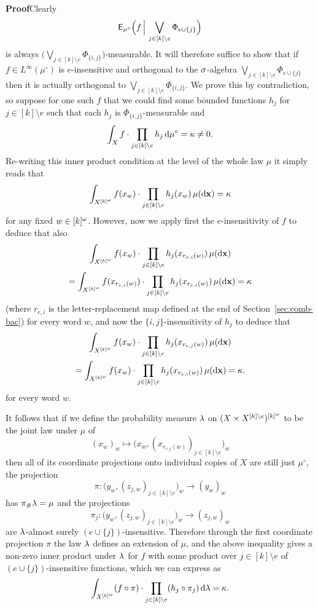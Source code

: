 \documentclass[11pt]{article}
\begin{document}
\textbf{Proof}\quad Clearly
\[\mathsf{E}_{\mu^\circ}\Big(f\,\Big|\,\bigvee_{j\in[k]\setminus e}\Phi_{e\cup\{j\}}\Big)\]
is always $\big(\bigvee_{j\in[k]\setminus
e}\Phi_{\{i,j\}}\big)$-measurable. It will therefore suffice to show
that if $f \in L^\infty(\mu^\circ)$ is $e$-insensitive and
orthogonal to the $\sigma$-algebra $\bigvee_{j\in [k]\setminus
e}\Phi_{e\cup\{j\}}$ then it is actually orthogonal to
$\bigvee_{j\in[k]\setminus e}\Phi_{\{i,j\}}$.  We prove this by
contradiction, so suppose for one such $f$ that we could find some
bounded functions $h_j$ for $j\in[k]\setminus e$ such that each
$h_j$ is $\Phi_{\{i,j\}}$-measurable and
\[\int_X f\cdot \prod_{j\in [k]\setminus e}h_j\,\mathrm{d}\mu^\circ = \kappa \neq 0.\]
Re-writing this inner product condition at the level of the whole
law $\mu$ it simply reads that
\[\int_{X^{[k]^\omega}}f(x_w)\cdot \prod_{j\in [k]\setminus e}h_j(x_w)\,\mu(\mathrm{d}\mathbf{x})  = \kappa\]
for any fixed $w \in [k]^\omega$.  However, now we apply first the
$e$-insensitivity of $f$ to deduce that also
\begin{multline*}
\int_{X^{[k]^\omega}}f(x_w)\cdot \prod_{j\in [k]\setminus
e}h_j(x_{r_{e,i}(w)})\,\mu(\mathrm{d}\mathbf{x})\\
=\int_{X^{[k]^\omega}}f(x_{r_{e,i}(w)})\cdot \prod_{j\in [k]\setminus
e}h_j(x_{r_{e,i}(w)})\,\mu(\mathrm{d}\mathbf{x}) = \kappa
\end{multline*}
(where $r_{e,i}$ is the letter-replacement map defined at the end of Section~\ref{sec:comb-bac}) for every word $w$, and now the $\{i,j\}$-insensitivity of $h_j$ to
deduce that
\begin{multline*}
\int_{X^{[k]^\omega}}f(x_w)\cdot \prod_{j\in [k]\setminus
e}h_j(x_{r_{e,j}(w)})\,\mu(\mathrm{d}\mathbf{x})\\
=\int_{X^{[k]^\omega}}f(x_w)\cdot \prod_{j\in [k]\setminus
e}h_j(x_{r_{e,i}(w)})\,\mu(\mathrm{d}\mathbf{x}) = \kappa.
\end{multline*}
for every word $w$.

It follows that if we define the probability measure $\lambda$ on
$(X\times X^{[k]\setminus e})^{[k]^\omega}$ to be the joint law under
$\mu$ of
\[(x_w)_w \mapsto \big(x_w,(x_{r_{e,j}(w)})_{j\in [k]\setminus e}\big)_w\]
then all of its coordinate projections onto individual copies of $X$
are still just $\mu^\circ$, the projection
\[\pi:\big(y_w,(z_{j,w})_{j\in [k]\setminus e}\big)_w\to (y_w)_w\]
has $\pi_\#\lambda = \mu$ and the projections
\[\pi_j:\big(y_w,(z_{j,w})_{j\in [k]\setminus e}\big)_w\to (z_{j,w})_w\]
are $\lambda$-almost surely $(e\cup\{j\})$-insensitive.  Therefore
through the first coordinate projection $\pi$ the law $\lambda$ defines
an extension of $\mu$, and the above inequality gives a non-zero
inner product under $\lambda$ for $f$ with some product over $j\in
[k]\setminus e$ of
$(e\cup\{j\})$-insensitive functions, which we can express as
\[\int_{X^{[k]^\omega}} (f\circ\pi)\cdot\prod_{j \in [k]\setminus e}(h_j\circ\pi_j)\,\mathrm{d}\lambda  = \kappa.\]
\end{document}

